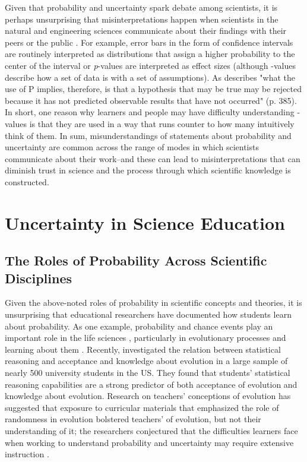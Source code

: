 \documentclass[man]{apa7}
\begin{document}
Given that probability and uncertainty spark debate among scientists, it is perhaps unsurprising that misinterpretations happen when scientists in the natural and engineering sciences communicate about their findings with their peers or the public \parencite[]{gkv04, c14, mg17}. For example, error bars in the form of confidence intervals are routinely interpreted as distributions that assign a higher probability to the center of the interval \parencite{kl18} or \emph{p}-values are interpreted as effect sizes \parencite{gc17, n14} (although -values describe how  a set of data is with a set of assumptions). As \textcite[][]{jeffreys1961} describes "what the use of P implies, therefore, is that a hypothesis that may be true may be rejected because it has not predicted observable results that have not occurred" (p. 385). In short, one reason why learners and people may have difficulty understanding -values is that they are used in a way that runs counter to how many intuitively think of them. In sum, misunderstandings of statements about probability and uncertainty are common across the range of modes in which scientists communicate about their work--and these can lead to misinterpretations that can diminish trust in science and the process through which scientific knowledge is constructed.

\section{Uncertainty in Science Education}

\subsection{The Roles of Probability Across Scientific Disciplines}

Given the above-noted roles of probability in scientific concepts and theories, it is unsurprising that educational researchers have documented how students learn about probability. As one example, probability and chance events play an important role in the life sciences \parencite{g03, gk08}, particularly in evolutionary processes and learning about them \parencite{th17}. Recently, \textcite{fsnh19} investigated the relation between statistical reasoning and acceptance and knowledge about evolution in a large sample of nearly 500 university students in the US. They found that students’ statistical reasoning capabilities are a strong predictor of both acceptance of evolution and knowledge about evolution. Research on teachers' conceptions of evolution has suggested that exposure to curricular materials that emphasized the role of randomness in evolution bolstered teachers'  of evolution, but not their understanding of it; the researchers conjectured that the difficulties learners face when working to understand probability and uncertainty may require extensive instruction \parencite{nadelson2010shifting}.
\end{document}
